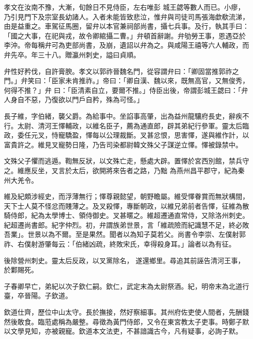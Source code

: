 \begin{pinyinscope}
 孝文在汝南不豫，大漸，旬餘日不見侍臣，左右唯彭
 城王勰等數人而已。小瘳，乃引見門下及宗室長幼諸人。入者未能皆致悲泣，惟弁與司徒司馬張海歔欷流涕，由是益重之。車駕征馬圈，留弁以本官兼祠部尚書，攝七兵事。及行，執其手曰：「國之大事，在祀與戎，故令卿綰攝二曹。」弁頓首辭謝。弁劬勞王事，恩遇亞於李沖。帝每稱弁可為吏部尚書，及崩，遺詔以弁為之。與咸陽王禧等六人輔政，而弁先卒。年三十八。贈瀛州刺史，謚曰貞順。



 弁性好矜伐，自許膏腴。孝文以郭祚晉魏名門，從容謂弁曰：「卿固當推郭祚之門。」弁笑曰：「臣家未肯推祚。」帝曰：「卿自漢、魏以來，既無高官，又無俊秀，何得不推？」弁
 曰：「臣清素自立，要爾不推。」侍臣出後，帝謂彭城王勰曰：「弁人身自不惡，乃復欲以門戶自矜，殊為可怪。」



 長子維，字伯緒，襲父爵。為給事中。坐諂事高肇，出為益州龍驤府長史，辭疾不行。太尉、清河王懌輔政，以維名臣子，薦為通直郎，辟其弟紀行參軍。靈太后臨政，委任元叉，恃寵驕盈，懌每以公理裁斷。叉甚忿恨，思害懌，遂與維作計，以富貴許之。維見叉寵勢日隆，乃告司染都尉韓文殊父子謀逆立懌。懌被錄禁中。



 文殊父子懼而逃遁。鞫無反狀，以文殊亡走，懸處大辟。置懌於宮西別館，禁兵守之。維應反坐，叉言於太后，欲開將來告者之路，乃黜
 為燕州昌平郡守，紀為秦州大羌令。



 維及紀頗涉經史，而浮薄無行；懌尊親懿望，朝野瞻屬。維受懌眷賞而無狀構間，天下士人莫不怪忿而賤薄之。及叉殺懌，專斷朝政，以維兄弟前者告懌，征維為散騎侍郎，紀為太學博士、領侍御史。叉甚暱之。維超遷通直常侍，又除洛州刺史。紀超遷尚書郎。紀字仲烈。初，弁謂族弟世景，言「維疏險而紀識慧不足，終必敗吾業」。世景以為不爾。至是果然。聞者以為知子莫若父。尚書令李崇、左僕射郭祚、右僕射游肇每云：「伯緒凶疏，終敗宋氏，幸得殺身耳。」論者以為有征。



 後除營州刺史。靈太后反政，以叉黨除名，
 遂還鄉里。尋追其前誣告清河王事，於鄴賜死。



 子春卿早亡，弟紀以次子欽仁嗣。欽仁，武定末為太尉祭酒。紀，明帝末為北道行臺，卒晉陽。子欽道。



 欽道仕齊，歷位中山太守。長於撫接，然好察細事。其州府佐吏使人間者，先酬錢然後敢食。臨蒞處稱為嚴整。尋徵為黃門侍郎，又令在東宮教太子吏事。時鄭子默以文學見知，亦被親寵。欽道本文法吏，不甚諳識古今，凡有疑事，必詢子默。




\end{pinyinscope}
